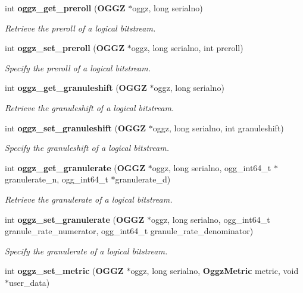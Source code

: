 \begin{DoxyCompactItemize}
int {\bf oggz\_\-get\_\-preroll} ({\bf OGGZ} $\ast$oggz, long serialno)
\begin{DoxyCompactList}\small\item\em Retrieve the preroll of a logical bitstream. \item\end{DoxyCompactList}\item 
int {\bf oggz\_\-set\_\-preroll} ({\bf OGGZ} $\ast$oggz, long serialno, int preroll)
\begin{DoxyCompactList}\small\item\em Specify the preroll of a logical bitstream. \item\end{DoxyCompactList}\item 
int {\bf oggz\_\-get\_\-granuleshift} ({\bf OGGZ} $\ast$oggz, long serialno)
\begin{DoxyCompactList}\small\item\em Retrieve the granuleshift of a logical bitstream. \item\end{DoxyCompactList}\item 
int {\bf oggz\_\-set\_\-granuleshift} ({\bf OGGZ} $\ast$oggz, long serialno, int granuleshift)
\begin{DoxyCompactList}\small\item\em Specify the granuleshift of a logical bitstream. \item\end{DoxyCompactList}\item 
int {\bf oggz\_\-get\_\-granulerate} ({\bf OGGZ} $\ast$oggz, long serialno, ogg\_\-int64\_\-t $\ast$granulerate\_\-n, ogg\_\-int64\_\-t $\ast$granulerate\_\-d)
\begin{DoxyCompactList}\small\item\em Retrieve the granulerate of a logical bitstream. \item\end{DoxyCompactList}\item 
int {\bf oggz\_\-set\_\-granulerate} ({\bf OGGZ} $\ast$oggz, long serialno, ogg\_\-int64\_\-t granule\_\-rate\_\-numerator, ogg\_\-int64\_\-t granule\_\-rate\_\-denominator)
\begin{DoxyCompactList}\small\item\em Specify the granulerate of a logical bitstream. \item\end{DoxyCompactList}\item 
int {\bf oggz\_\-set\_\-metric} ({\bf OGGZ} $\ast$oggz, long serialno, {\bf OggzMetric} metric, void $\ast$user\_\-data)

\end{DoxyCompactItemize}
